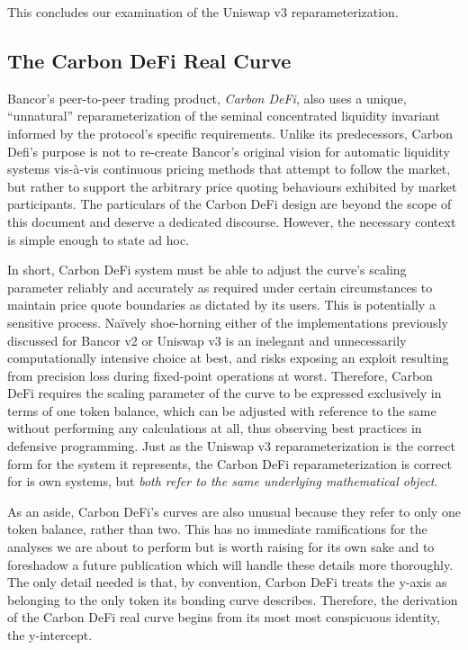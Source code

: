 \documentclass{article}
\begin{document}
This concludes our examination of the Uniswap v3 reparameterization. 

\subsection{The Carbon DeFi Real Curve}\label{subsec4.4}

Bancor’s peer-to-peer trading product, \textit{Carbon DeFi}, also uses a unique, “unnatural” reparameterization of the seminal concentrated liquidity invariant informed by the protocol’s specific requirements. Unlike its predecessors, Carbon Defi’s purpose is not to re-create Bancor’s original vision for automatic liquidity systems vis-à-vis continuous pricing methods that attempt to follow the market, but rather to support the arbitrary price quoting behaviours exhibited by market participants. The particulars of the Carbon DeFi design are beyond the scope of this document and deserve a dedicated discourse. However, the necessary context is simple enough to state ad hoc. 

In short, Carbon DeFi system must be able to adjust the curve’s scaling parameter reliably and accurately as required under certain circumstances to maintain price quote boundaries as dictated by its users. This is potentially a sensitive process. Naïvely shoe-horning either of the implementations previously discussed for Bancor v2 or Uniswap v3 is an inelegant and unnecessarily computationally intensive choice at best, and risks exposing an exploit resulting from precision loss during fixed-point operations at worst. Therefore, Carbon DeFi requires the scaling parameter of the curve to be expressed exclusively in terms of one token balance, which can be adjusted with reference to the same without performing any calculations at all, thus observing best practices in defensive programming. Just as the Uniswap v3 reparameterization is the correct form for the system it represents, the Carbon DeFi reparameterization is correct for is own systems, but \textit{both refer to the same underlying mathematical object}.

As an aside, Carbon DeFi’s curves are also unusual because they refer to only one token balance, rather than two. This has no immediate ramifications for the analyses we are about to perform but is worth raising for its own sake and to foreshadow a future publication which will handle these details more thoroughly. The only detail needed is that, by convention, Carbon DeFi treats the y-axis as belonging to the only token its bonding curve describes. Therefore, the derivation of the Carbon DeFi real curve begins from its most most conspicuous identity, the y-intercept. 
\end{document}

